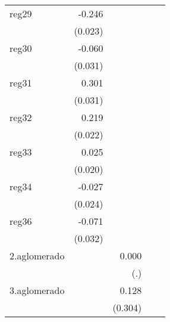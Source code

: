 {\begin{longtable}{l*{4}{D{.}{.}{-1}}}
\addlinespace
reg29       &      -0.246\sym{***}&                     &                     &                     \\
            &     (0.023)         &                     &                     &                     \\
\addlinespace
reg30       &      -0.060         &                     &                     &                     \\
            &     (0.031)         &                     &                     &                     \\
\addlinespace
reg31       &       0.301\sym{***}&                     &                     &                     \\
            &     (0.031)         &                     &                     &                     \\
\addlinespace
reg32       &       0.219\sym{***}&                     &                     &                     \\
            &     (0.022)         &                     &                     &                     \\
\addlinespace
reg33       &       0.025         &                     &                     &                     \\
            &     (0.020)         &                     &                     &                     \\
\addlinespace
reg34       &      -0.027         &                     &                     &                     \\
            &     (0.024)         &                     &                     &                     \\
\addlinespace
reg36       &      -0.071\sym{*}  &                     &                     &                     \\
            &     (0.032)         &                     &                     &                     \\
\addlinespace
2.aglomerado&                     &       0.000         &                     &                     \\
            &                     &         (.)         &                     &                     \\
\addlinespace
3.aglomerado&                     &       0.128         &                     &                     \\
            &                     &     (0.304)         &                     &                     \\

\end{longtable}}
